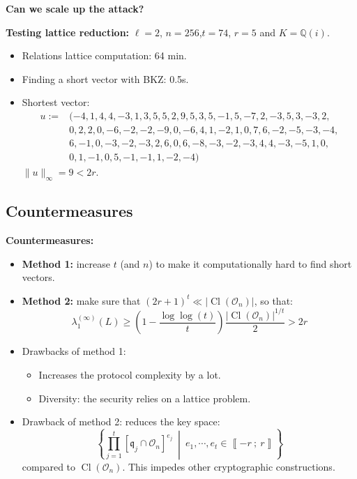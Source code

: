 \documentclass[10pt]{beamer}
\theoremstyle{plain}
\theoremstyle{definition}
\newcommand{\Q}{\mathbb{Q}}
\newcommand{\mO}{\mathcal{O}}
\renewcommand{\i}[2]{\left\llbracket #1~;~#2\right\rrbracket}
\renewcommand{\(}{\left(}
\renewcommand{\)}{\right)}
\newcommand{\mf}[1]{\mathfrak{#1}}
\DeclareMathOperator{\Cl}{Cl}
\begin{document}
\begin{frame}
\textbf{Can we scale up the attack?} 

\vspace{0.5cm}

\textbf{Testing lattice reduction:} $\ell=2$, $n=256$,$t=74$, $r=5$ and $K=\Q(i)$.

\begin{itemize}
\item Relations lattice computation: 64 min.
\item Finding a short vector with BKZ: 0.5s.
\item Shortest vector:
\begin{align*}u:=&(-4, 1, 4, 4, -3, 1, 3, 5, 5, 2, 9, 5, 3, 5, -1, 5, -7, 2, -3, 5, 3, -3, 2,\\
&0, 2, 2, 0, -6, -2, -2, -9, 0, -6, 4, 1, -2, 1, 0, 7, 6, -2, -5, -3, -4, \\
&6, -1, 0, -3,-2, -3, 2, 6, 0, 6, -8, -3, -2, -3, 4, 4, -3, -5, 1, 0, \\
&0, 1, -1, 0, 5, -1, -1, 1, -2, -4)\end{align*}
$\|u\|_\infty=9<2r$.
\end{itemize}
\end{frame}

\subsection{Countermeasures}

\begin{frame}
\textbf{Countermeasures:}

\vspace{0.5cm}
\begin{itemize}
\item \textbf{Method 1:} increase $t$ (and $n$) to make it computationally hard to find short vectors.

\item \textbf{Method 2:} make sure that $(2r+1)^t\ll |\Cl(\mO_n)|$, so that:
\[ \lambda_1^{(\infty)}(L)\geq \(1-\frac{\log\log(t)}{t}\)\frac{|\Cl(\mO_n)|^{1/t}}{2}> 2r\]
\pause 
\item Drawbacks of method 1:
\begin{itemize}
\item Increases the protocol complexity by a lot.
\item Diversity: the security relies on a lattice problem.
\end{itemize}
\pause
\item Drawback of method 2: reduces the key space:
\[\left\{\prod_{j=1}^t [\mf{q}_j\cap\mO_n]^{e_j} \ \middle| \ e_1,\cdots, e_t\in\i{-r}{r} \right\}\]
compared to $\Cl(\mO_n)$. This impedes other cryptographic constructions.
\end{itemize}
\end{frame}
\end{document}
